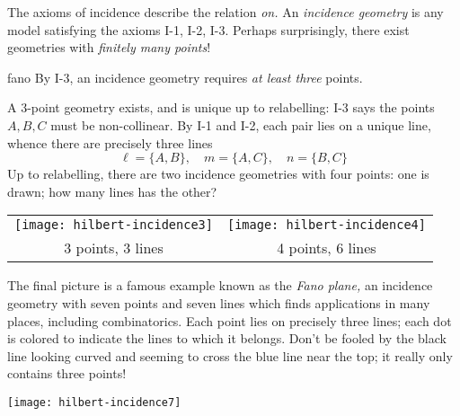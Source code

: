 \pagebreak



The axioms of incidence describe the relation \emph{on.} An \emph{incidence geometry} is any model satisfying the axioms I-1, I-2, I-3. Perhaps surprisingly, there exist geometries with \emph{finitely many points}!

\begin{examples}{}{fano}
By I-3, an incidence geometry requires \emph{at least three} points.\par
\begin{minipage}[t]{0.62\linewidth}\vspace{-5pt}
A 3-point geometry exists, and is unique up to relabelling:\smallbreak
I-3 says the points $A,B,C$ must be non-collinear. By I-1 and I-2, each pair lies on a unique line, whence there are precisely three lines
\[\ell=\{A,B\},\quad m=\{A,C\},\quad n=\{B,C\}\]
Up to relabelling, there are two incidence geometries with four points: one is drawn; how many lines has the other?
\end{minipage}\hfill\begin{minipage}[t]{0.37\linewidth}\vspace{-15pt}
\flushright
\begin{tabular}{cc@{}}
\texttt{[image: hilbert-incidence3]}
&
\texttt{[image: hilbert-incidence4]}\\
3 points, 3 lines
&
4 points, 6 lines%
\end{tabular}
\end{minipage}\smallbreak
\begin{minipage}[t]{0.72\linewidth}\vspace{0pt}
The final picture is a famous example known as the \emph{Fano plane,} an incidence geometry with seven points and seven lines which finds applications in many places, including combinatorics. Each point lies on precisely three lines; each dot is colored to indicate the lines to which it belongs. Don't be fooled by the black line looking curved and seeming to cross the blue line near the top; it really only contains three points!
\end{minipage}\hfill\begin{minipage}[t]{0.27\linewidth}\vspace{-17pt}
\flushright
\texttt{[image: hilbert-incidence7]}
\end{minipage}
\end{examples}

